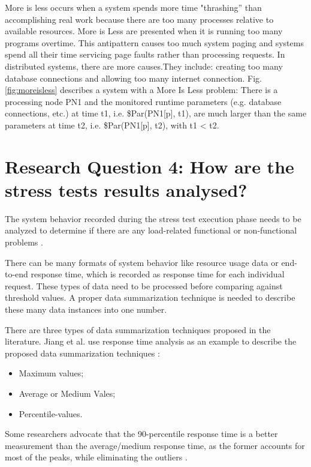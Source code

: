 More is less occurs when a system spends more time "thrashing” than accomplishing real work because there are too many processes relative to available resources. More is Less are presented when it is running too many programs overtime. This antipattern causes too much system paging and systems spend all their time servicing page faults rather than processing requests. In distributed systems, there are more causes.They include: creating too many database connections and  allowing too many internet connection. Fig. \ref{fig:moreisless} describes a system  with a More Is Less problem: There is a processing node PN1 and the monitored runtime parameters (e.g. database connections, etc.) at time t1, i.e. \$Par(PN1[p], t1), are much larger than the same parameters at time t2, i.e. \$Par(PN1[p], t2), with t1 < t2. 


\section{Research Question 4: How are the stress tests results analysed?}

The system behavior recorded during the stress test execution phase needs to be analyzed to determine if there are any load-related functional or non-functional problems \cite{Jiang2010}. 


There can be many formats of system behavior like resource usage data or end-to-end response time, which is recorded as response time for each individual request. These types of data need to be processed before comparing against threshold values. A proper data summarization technique is needed to describe these many data instances into one number. 


There are three types of data summarization techniques proposed in the literature. Jiang et al. use response time analysis as an example to describe the proposed data summarization techniques \cite{Jiang2010}:

\begin{itemize}
\item Maximum values;
\item Average or Medium Vales;
\item Percentile-values. 
\end{itemize}


Some researchers advocate that the 90-percentile response time is a better measurement than the average/medium response time, as the former accounts for most of the peaks, while eliminating the outliers \cite{Jiang2010}.


